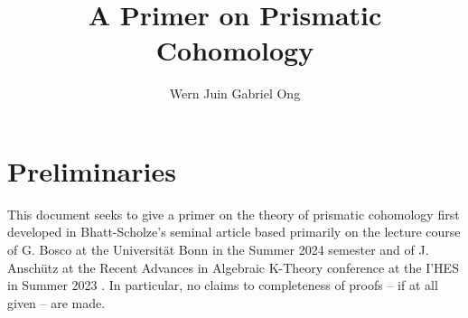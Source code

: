 \documentclass{amsart}
\theoremstyle{definition}
\numberwithin{equation}{section}
\begin{document}
\large
\title[A Prismatic Primer]{A Primer on Prismatic Cohomology}
\author{Wern Juin Gabriel Ong}
\address{Universit\"{a}t Bonn, Bonn, D-53111}
\maketitle
\section*{Preliminaries}
This document seeks to give a primer on the theory of prismatic cohomology first developed in Bhatt-Scholze's seminal article \cite{BSPrismatic} based primarily on the lecture course of G. Bosco at the Universit\"{a}t Bonn in the Summer 2024 semester \cite{Bosco} and of J. Ansch\"{u}tz at the Recent Advances in Algebraic K-Theory conference at the I'HES in Summer 2023 \cite{Anschutz}. In particular, no claims to completeness of proofs -- if at all given -- are made. 
\tableofcontents
\newpage







\printbibliography
\end{document}
